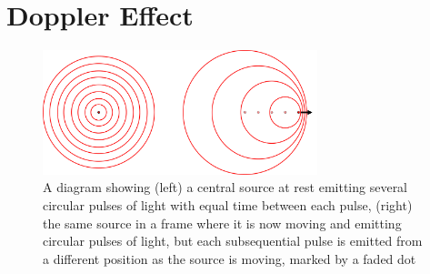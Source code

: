 
\section{Doppler Effect}

\begin{figure}[H]
	\centering
	\includegraphics[width=8cm]{images/pdf/Doppler.pdf}
	\caption{A diagram showing (left) a central source at rest emitting several circular pulses of light with equal time between each pulse, (right) the same source in a frame where it is now moving and emitting circular pulses of light, but each subsequential pulse is emitted from a different position as the source is moving, marked by a faded dot}
	\label{fig: doppler effect intro}
\end{figure}

